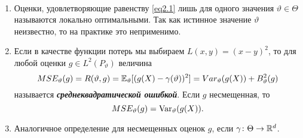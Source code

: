 \begin{rmrk} \
	\begin{enumerate}
		\item Оценки, удовлетворяющие равенству \eqref{eq2.1} лишь для одного значения $\vartheta \in \Theta$ называются локально оптимальными. Так как истинное значение $\vartheta$ неизвестно, то на практике это неприменимо. 
		\item Если в качестве функции потерь мы выбираем $L(x,y)=(x-y)^2$, то для любой оценки $g \in L^2(P_\vartheta)$ величина
		\[ MSE_\vartheta(g) = R(\vartheta, g)=\mathbb{E}_\vartheta[(g(X)-\gamma(\vartheta))^2]=Var_\vartheta(g(X))+B_\vartheta^2(g) \]
		называется \textbf{\textit{среднеквадратической ошибкой}}. Если $g$ несмещенная, то
		\[MSE_\vartheta(g)=\mathrm{Var}_\vartheta(g(X)). \]
		\item Аналогичное определение для несмещенных оценок $g$, если $\gamma\colon \Theta \rightarrow \mathbb{R}^d$.
	\end{enumerate}
\end{rmrk}

